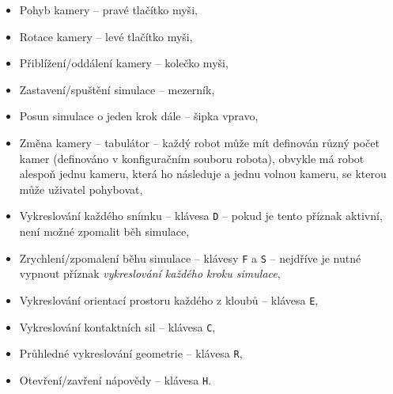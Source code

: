 \begin{itemize}
    \item Pohyb kamery -- pravé tlačítko myši,
    \item Rotace kamery -- levé tlačítko myši,
    \item Přiblížení/oddálení kamery -- kolečko myši,
    \item Zastavení/spuštění simulace -- mezerník,
    \item Posun simulace o jeden krok dále -- šipka vpravo,
    \item Změna kamery -- tabulátor -- každý robot může mít definován různý počet
        kamer (definováno v konfiguračním souboru robota), obvykle má robot
        alespoň jednu kameru, která ho následuje a jednu volnou kameru, se
        kterou může uživatel pohybovat,
    \item Vykreslování každého snímku -- klávesa \texttt{D} -- pokud je tento
        příznak aktivní, není možné zpomalit běh simulace,
    \item Zrychlení/zpomalení běhu simulace -- klávesy \texttt{F} a \texttt{S}
        -- nejdříve je nutné vypnout příznak \emph{vykreslování každého kroku
        simulace},
    \item Vykreslování orientací prostoru každého z kloubů -- klávesa \texttt{E},
    \item Vykreslování kontaktních sil -- klávesa \texttt{C},
    \item Průhledné vykreslování geometrie -- klávesa \texttt{R},
    \item Otevření/zavření nápovědy -- klávesa \texttt{H}.
\end{itemize}
